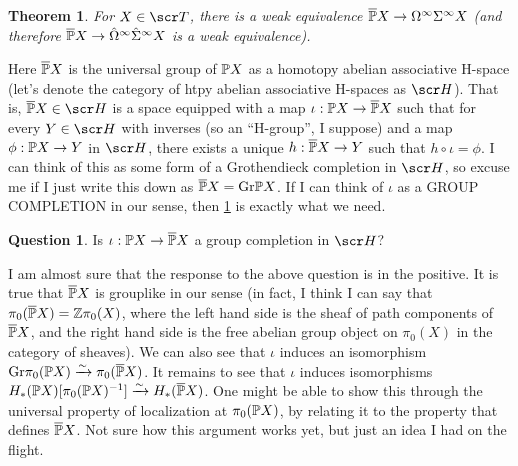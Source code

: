 \documentclass{amsart}
\newtheorem{thm}{Theorem}[section]
\theoremstyle{definition}
\newtheorem{quest}[defn]{Question}
\begin{document}
\begin{thm}\label{thm:grpcomp}
For $X \in \sT$, there is a weak equivalence $\overline{\mathbb{P}} X \to \Omega^{\infty} \Sigma^{\infty} X$ (and therefore $\overline{\mathbb{P}} X \to \hat{\Omega}^{\infty} \hat{\Sigma}^{\infty} X$ is a weak equivalence).
\end{thm}

\noindent Here $\overline{\mathbb{P}}X$ is the universal group of $\mathbb{P} X$ as a homotopy abelian associative H-space (let's denote the category of htpy abelian associative H-spaces as $\sH$). That is, $\overline{\bP}X \in \sH$ is a space equipped with a map $\iota : \mathbb{P} X \to \overline{\mathbb{P}} X$ such that for every $Y \in \sH$ with inverses (so an ``H-group'', I suppose) and a map $\phi : \mathbb{P} X \to Y$ in $\sH$, there exists a unique $h:\overline{\mathbb{P}}X \to Y$ such that $h \circ \iota = \phi$. I can think of this as some form of a Grothendieck completion in $\sH$, so excuse me if I just write this down as $\overline{\mathbb{P}}X = \mathrm{Gr}\mathbb{P} X$. If I can think of $\iota$ as a GROUP COMPLETION in our sense, then \ref{thm:grpcomp} is exactly what we need.

\begin{quest}
Is $\iota: \mathbb{P} X \to \overline{\mathbb{P}} X$ a group completion in $\sH$?
\end{quest}

I am almost sure that the response to the above question is in the positive. It is true that $\overline{\mathbb{P}} X$ is grouplike in our sense (in fact, I think I can say that $\pi_0 (\overline{\mathbb{P}} X) = \mathbb{Z} \pi_0 (X)$, where the left hand side is the sheaf of path components of $\overline{\mathbb{P}}X$, and the right hand side is the free abelian group object on $\pi_0(X)$ in the category of sheaves). We can also see that $\iota$ induces an isomorphism $\mathrm{Gr} \pi_0 (\mathbb{P} X) \xrightarrow{\sim} \pi_0 (\overline{\mathbb{P}}X)$. It remains to see that $\iota$ induces isomorphisms $H_{*}(\mathbb{P} X) [\pi_0(\mathbb{P} X)^{-1}] \xrightarrow{\sim} H_{*} (\overline{\mathbb{P}} X)$. One might be able to show this through the universal property of localization at $\pi_0(\mathbb{P} X)$, by relating it to the property that defines $\overline{\mathbb{P}} X$. Not sure how this argument works yet, but just an idea I had on the flight.
\printbibliography
\end{document}
